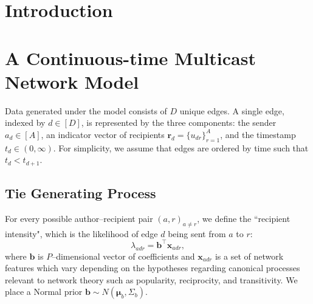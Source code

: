 \documentclass[12pt]{article}
\begin{document}
\newpage
{} %
\section{Introduction}\label{sec:intro}
\section{A Continuous-time Multicast Network Model}\label{sec:generative process}
Data generated under the model consists of $D$ unique edges. A single edge, indexed by $d \in [D]$, is represented by the three components: the sender $a_d \in [A]$, an indicator vector of recipients $\boldsymbol{r}_d = \{u_{dr} \}_{r=1}^{A}$, and the timestamp $t_d \in (0, \infty)$. For simplicity, we assume that edges are ordered by time such that $t_d < t_{d+1}$.
\subsection{Tie Generating Process}\label{subsec: Tie}
For every possible author--recipient pair $(a,r)_{a \neq r}$, we define the ``recipient intensity", which is the likelihood of edge $d$ being sent from $a$ to $r$:
\begin{equation}
\lambda_{adr} = {\boldsymbol{b}}^{\top}\boldsymbol{x}_{adr},
\end{equation}
where $\boldsymbol{b}$ is $P$--dimensional vector of coefficients and $\boldsymbol{x}_{adr}$ is a set of network features which vary depending on the hypotheses regarding canonical processes relevant to network theory such as popularity, reciprocity, and transitivity. We place a Normal prior $\boldsymbol{b} \sim N(\boldsymbol{\mu}_b, \Sigma_b)$.
\end{document}
